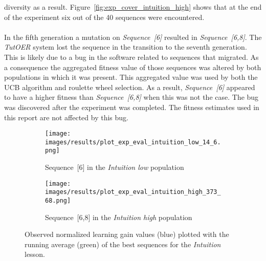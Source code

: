 diversity as a result. Figure~\ref{fig:exp_cover_intuition_high} shows that at
the end of the experiment six out of the 40 sequences were encountered.\\\\
\noindent
In the fifth generation a mutation on \emph{Sequence~[6]} resulted in
\emph{Sequence~[6,8]}. The \emph{TutOER} system lost the sequence in the
transition to the seventh generation. This is likely due to a bug in the
software related to sequences that migrated. As a consequence the aggregated
fitness value of those sequences was altered by both populations in which it
was present. This aggregated value was used by both the UCB algorithm and
roulette wheel selection. As a result, \emph{Sequence~[6]} appeared to have a
higher fitness than \emph{Sequence~[6,8]} when this was not the case. The bug
was discovered after the experiment was completed. The fitness estimates used
in this report are not affected by this bug.

\begin{figure}[ht]
	\begin{subfigure}{0.9\linewidth}
	\centering
	\texttt{[image: images/results/plot\_exp\_eval\_intuition\_low\_14\_6.png]}
	\caption{Sequence~[6] in the \emph{Intuition low} population}
	\label{fig:exp_eval_intuition_low_14}
	\end{subfigure}
	\hfill
	\begin{subfigure}{0.9\linewidth}
	\centering
	\texttt{[image: images/results/plot\_exp\_eval\_intuition\_high\_373\_68.png]}
	\caption{Sequence~[6,8] in the \emph{Intuition high} population}
	\label{fig:exp_eval_intuition_high_373}
	\end{subfigure}
	\caption[Evaluations of best sequences in Intuition]{Observed normalized learning gain values (blue) plotted with the
		running average (green) of the best sequences for the \emph{Intuition}
	lesson.}
	\label{fig:exp_eval_intuition}
\end{figure}

